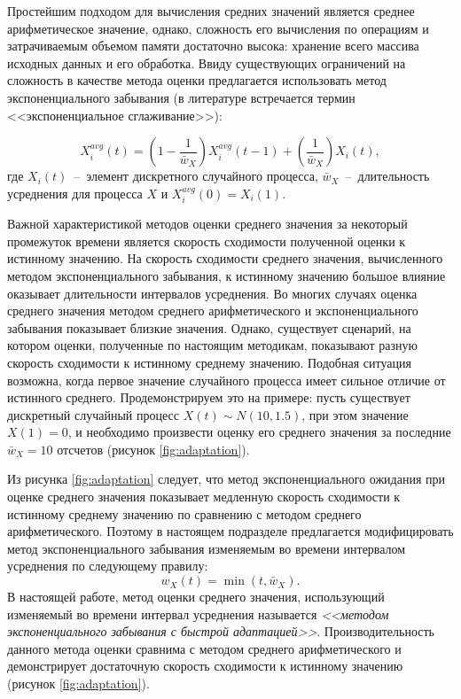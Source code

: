 Простейшим подходом для вычисления средних значений является среднее арифметическое значение, однако, сложность его вычисления по операциям и затрачиваемым объемом памяти достаточно высока: хранение всего массива исходных данных и его обработка. Ввиду существующих ограничений на сложность в качестве метода оценки предлагается использовать метод экспоненциального забывания (в литературе встречается термин <<экспоненциальное сглаживание>>):

$$X_i^{avg}(t) = \left(1 - \frac{1}{\bar{w}_{X}}\right)X_i^{avg}(t - 1) + \left(\frac{1}{\bar{w}_{X}}\right)X_i(t),$$
где $X_i(t)$~--~элемент дискретного случайного процесса, $\bar{w}_{X}$~--~длительность усреднения для процесса $X$ и $X_i^{avg}(0) = X_i(1)$.

Важной характеристикой методов оценки среднего значения за некоторый промежуток времени является скорость сходимости полученной оценки к истинному значению. На скорость сходимости среднего значения, вычисленного методом экспоненциального забывания, к истинному значению большое влияние оказывает длительности интервалов усреднения. Во многих случаях оценка среднего значения методом среднего арифметического и экспоненциального забывания показывает близкие значения. Однако, существует сценарий, на котором оценки, полученные по настоящим методикам, показывают разную скорость сходимости к истинному среднему значению. Подобная ситуация возможна, когда первое значение случайного процесса имеет сильное отличие от истинного среднего. Продемонстрируем это на примере: пусть существует дискретный случайный процесс $X(t) \sim N(10,1.5)$, при этом значение $X(1) = 0$, и необходимо произвести оценку его среднего значения за последние $\bar{w}_{X} = 10$ отсчетов (рисунок \ref{fig:adaptation}).

Из рисунка \ref{fig:adaptation} следует, что метод экспоненциального ожидания при оценке среднего значения показывает медленную скорость сходимости к истинному среднему значению по сравнению с методом среднего арифметического. Поэтому в настоящем подразделе предлагается модифицировать метод экспоненциального забывания изменяемым во времени интервалом усреднения по следующему правилу:
$$w_{X}(t) = \min(t, \bar{w}_{X}).$$
В настоящей работе, метод оценки среднего значения, использующий изменяемый во времени интервал усреднения называется \textit{<<методом экспоненциального забывания с быстрой адаптацией>>}. Производительность данного метода оценки сравнима с методом среднего арифметического и демонстрирует достаточную скорость сходимости к истинному значению (рисунок \ref{fig:adaptation}).

